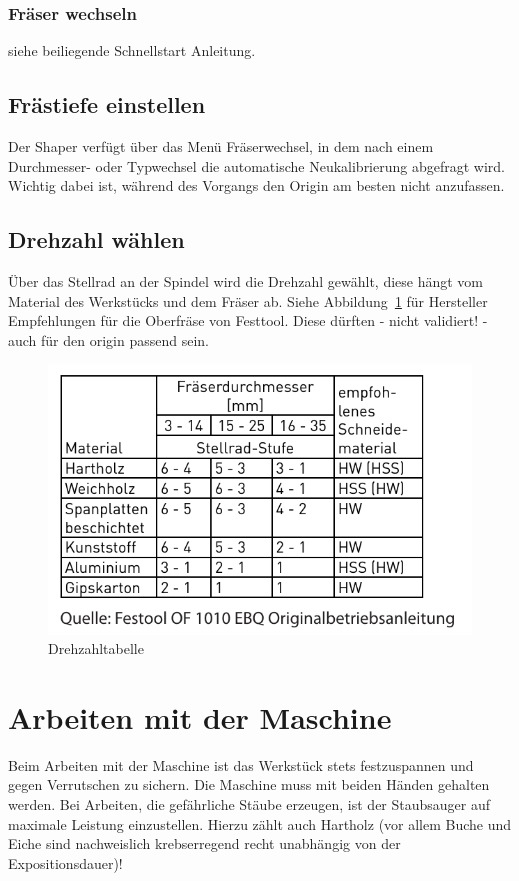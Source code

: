 \documentclass{\basedir/fablab-document}
\begin{document}
\subsubsection{Fräser wechseln}
siehe beiliegende Schnellstart Anleitung.

\subsection{Frästiefe einstellen}
Der Shaper verfügt über das Menü Fräserwechsel, in dem nach einem Durchmesser- oder Typwechsel die automatische Neukalibrierung abgefragt wird. Wichtig dabei ist, während des Vorgangs den Origin am besten nicht anzufassen.

\subsection{Drehzahl wählen}
Über das Stellrad an der Spindel wird die Drehzahl gewählt, diese hängt vom Material des Werkstücks und dem Fräser ab. Siehe Abbildung~\ref{fig:drehzahl}  für Hersteller Empfehlungen für die Oberfräse von Festtool. Diese dürften - nicht validiert! - auch für den origin passend sein.
\begin{figure}[h!]
    \centering
    \includegraphics{img/drehzahltabelle.pdf}
    \caption{Drehzahltabelle}
    \label{fig:drehzahl}
\end{figure}

\section{Arbeiten mit der Maschine}
Beim Arbeiten mit der Maschine ist das Werkstück stets festzuspannen und gegen Verrutschen zu sichern. Die Maschine muss mit beiden Händen gehalten werden. Bei Arbeiten, die gefährliche Stäube erzeugen, ist der Staubsauger auf maximale Leistung einzustellen. Hierzu zählt auch Hartholz (vor allem Buche und Eiche sind nachweislich krebserregend recht unabhängig von der Expositionsdauer)!
\end{document}
